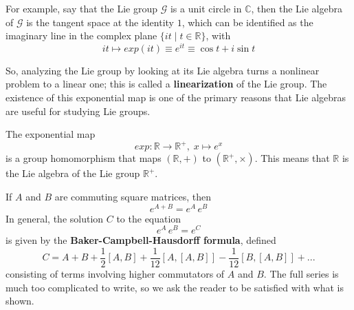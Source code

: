   For example, say that the Lie group $\mathcal{G}$ is a unit circle in $\mathbb{C}$, then the Lie algebra of $\mathcal{G}$ is the tangent space at the identity $1$, which can be identified as the imaginary line in the complex plane $\{i t \; | \; t \in \mathbb{R}\}$, with 
  \begin{equation}
    i t \mapsto exp(it) \equiv e^{it} \equiv \cos{t} + i \sin{t}
  \end{equation}

  \begin{center}
  \end{center}
  So, analyzing the Lie group by looking at its Lie algebra turns a nonlinear problem to a linear one; this is called a \textbf{linearization} of the Lie group. The existence of this exponential map is one of the primary reasons that Lie algebras are useful for studying Lie groups. 

  \begin{example}
    The exponential map 
    \begin{equation}
      exp: \mathbb{R} \rightarrow \mathbb{R}^+, \; x \mapsto e^x
    \end{equation}
    is a group homomorphism that maps $(\mathbb{R}, +)$ to $(\mathbb{R}^+, \times)$. This means that $\mathbb{R}$ is the Lie algebra of the Lie group $\mathbb{R}^+$. 
  \end{example}

  \begin{theorem}
    If $A$ and $B$ are commuting square matrices, then 
    \begin{equation}
      e^{A + B} = e^A \, e^B
    \end{equation}
    In general, the solution $C$ to the equation
    \begin{equation}
      e^{A} \, e^B = e^C
    \end{equation}
    is given by the \textbf{Baker-Campbell-Hausdorff formula}, defined
    \begin{equation}
      C = A + B + \frac{1}{2}[A,B] + \frac{1}{12} [A,[A,B]] - \frac{1}{12} [B,[A,B]] + ...
    \end{equation}
    consisting of terms involving higher commutators of $A$ and $B$. The full series is much too complicated to write, so we ask the reader to be satisfied with what is shown. 
  \end{theorem}

